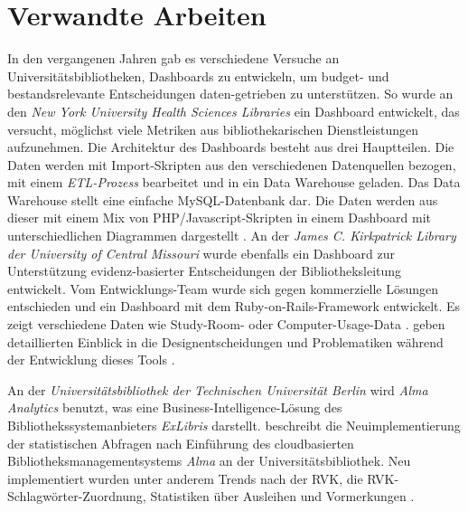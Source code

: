 



\section{Verwandte Arbeiten}
In den vergangenen Jahren gab es verschiedene Versuche an Universitätsbibliotheken, Dashboards zu entwickeln, um budget- und bestandsrelevante Entscheidungen daten-getrieben zu unterstützen.
So wurde an den \textit{New York University Health Sciences Libraries} ein Dashboard entwickelt, das versucht, möglichst viele Metriken
aus bibliothekarischen Dienstleistungen aufzunehmen. Die Architektur des Dashboards besteht aus drei Hauptteilen. Die Daten werden mit 
Import-Skripten aus den verschiedenen Datenquellen bezogen, mit einem \textit{\acrshort{ETL}-Prozess} bearbeitet und in ein Data Warehouse geladen. Das Data Warehouse 
stellt eine einfache MySQL-Datenbank dar. Die Daten werden aus dieser mit einem Mix von PHP/Javascript-Skripten in einem Dashboard mit unterschiedlichen Diagrammen
dargestellt \cite{morton-owens_trends_2012}.  An der \textit{James C. Kirkpatrick Library der University of Central Missouri} wurde ebenfalls ein Dashboard 
zur Unterstützung evidenz-basierter Entscheidungen der Bibliotheksleitung entwickelt. 
Vom Entwicklungs-Team wurde sich gegen kommerzielle Lösungen entschieden und ein Dashboard mit dem Ruby-on-Rails-Framework entwickelt. Es zeigt verschiedene Daten wie Study-Room- oder Computer-Usage-Data \cite{james_c_kirkpatrick_library_jckl_2020}.
\citeauthor{horne-popp_if_2018} geben detaillierten Einblick in die Designentscheidungen und Problematiken während der Entwicklung dieses Tools \cite[vgl.][194 ff.]{horne-popp_if_2018}. 

An der \textit{Universitätsbibliothek der Technischen Universität Berlin} wird \textit{Alma Analytics} benutzt, was eine Business-Intelligence-Lösung des Bibliothekssystemanbieters \textit{ExLibris} darstellt. 
 beschreibt die Neuimplementierung der statistischen Abfragen nach Einführung des cloudbasierten Bibliotheksmanagementsystems \textit{Alma} an der Universitätsbibliothek.
Neu implementiert wurden unter anderem Trends nach der \acrfull{RVK}, die RVK-Schlagwörter-Zuordnung, Statistiken über Ausleihen und Vormerkungen \cite{golas_statistische_2018}.

